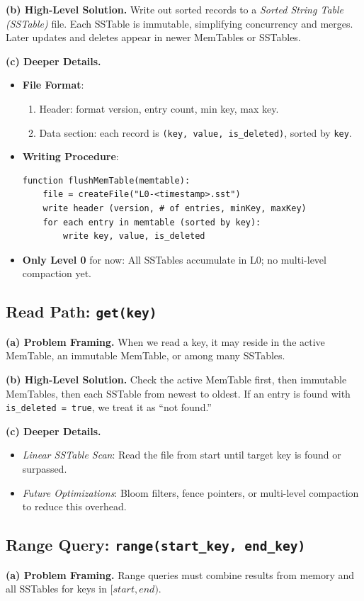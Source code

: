 \documentclass[10pt]{article}
\begin{document}
\textbf{(b) High-Level Solution.}  
Write out sorted records to a \emph{Sorted String Table (SSTable)} file. Each SSTable is immutable, simplifying concurrency and merges. Later updates and deletes appear in newer MemTables or SSTables.

\textbf{(c) Deeper Details.}  
\begin{itemize}
  \item \textbf{File Format}:
  \begin{enumerate}
    \item Header: format version, entry count, min key, max key.
    \item Data section: each record is \texttt{(key, value, is\_deleted)}, sorted by \texttt{key}.
  \end{enumerate}
  \item \textbf{Writing Procedure}:
\begin{verbatim}
function flushMemTable(memtable):
    file = createFile("L0-<timestamp>.sst")
    write header (version, # of entries, minKey, maxKey)
    for each entry in memtable (sorted by key):
        write key, value, is_deleted
\end{verbatim}
  \item \textbf{Only Level 0} for now: All SSTables accumulate in L0; no multi-level compaction yet.
\end{itemize}

\subsection{Read Path: \texttt{get(key)}}
\textbf{(a) Problem Framing.}  
When we read a key, it may reside in the active MemTable, an immutable MemTable, or among many SSTables.

\textbf{(b) High-Level Solution.}  
Check the active MemTable first, then immutable MemTables, then each SSTable from newest to oldest. If an entry is found with \texttt{is\_deleted = true}, we treat it as ``not found.''

\textbf{(c) Deeper Details.}  
\begin{itemize}
  \item \emph{Linear SSTable Scan}: Read the file from start until target key is found or surpassed.
  \item \emph{Future Optimizations}: Bloom filters, fence pointers, or multi-level compaction to reduce this overhead.
\end{itemize}

\subsection{Range Query: \texttt{range(start\_key, end\_key)}}
\textbf{(a) Problem Framing.}  
Range queries must combine results from memory and all SSTables for keys in $[start, end)$.
\end{document}
